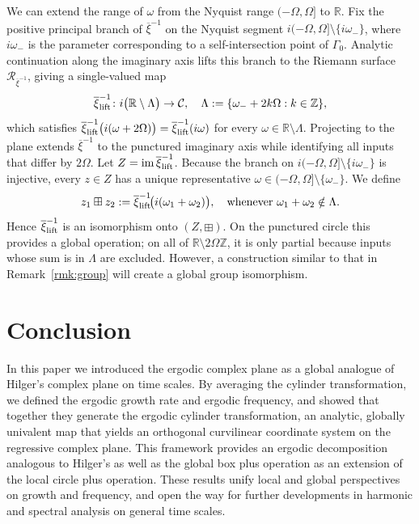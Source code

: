 \documentclass[reqno]{amsart}
\begin{document}
\begin{remark} \rm
We can extend the range of $\omega$ from the Nyquist range $(-\Omega,\Omega]$ to $\mathbb{R}$.
Fix the positive principal branch of $\overline{\xi}^{-1}$ on the Nyquist segment
$i(-\Omega,\Omega]\setminus\{i\omega_{-}\}$, where $i\omega_{-}$ is the
parameter corresponding to a self-intersection point of $\Gamma_0$.
Analytic continuation along the imaginary axis lifts this
branch to the Riemann surface $\mathcal R_{\overline{\xi}^{-1}}$, giving a
single-valued map
\[
 \overline{\xi}^{-1}_{\textup{lift}}\colon i\bigl(\mathbb{R}\setminus\Lambda\bigr)
 \to\mathcal{C},
 \quad
 \Lambda:=\{\omega_{-}+2k\Omega: k\in\mathbb{Z}\},
\]
which satisfies
$\overline{\xi}^{-1}_{\textup{lift}}\bigl(i(\omega+2\Omega)\bigr)=
 \overline{\xi}^{-1}_{\textup{lift}}(i\omega)$ for every
$\omega\in\mathbb{R}\setminus\Lambda$.
Projecting to the plane extends $\overline{\xi}^{-1}$ to the punctured imaginary
axis while identifying all inputs that differ by $2\Omega$.
Let $Z=\operatorname{im}\overline{\xi}^{-1}_{\textup{lift}}$.
Because the branch on
$i(-\Omega,\Omega]\setminus\{i\omega_{-}\}$ is injective, every
$z\in Z$ has a unique representative
$\omega\in(-\Omega,\Omega]\setminus\{\omega_{-}\}$.
We define
\[
 z_1\boxplus z_2:=
 \overline{\xi}^{-1}_{\textup{lift}}\!\bigl(i(\omega_1+\omega_2)\bigr),
 \quad
 \text{whenever }\omega_1+\omega_2\notin\Lambda.
\]
Hence $\overline{\xi}^{-1}_{\textup{lift}}$ is an isomorphism onto $(Z,\boxplus)$.
On the punctured circle this provides a global operation; on all of
$\mathbb{R}\setminus 2\Omega\mathbb{Z}$, it is only partial because inputs whose sum is in $\Lambda$
are excluded. However, a construction similar to that in Remark~\ref{rmk:group}
will create a global group isomorphism.
\end{remark}

\section{Conclusion}
In this paper we introduced the ergodic complex plane as a global analogue of Hilger's
complex plane on time scales. By averaging the cylinder transformation, we defined
the ergodic growth rate and ergodic frequency, and showed that together they generate
the ergodic cylinder transformation, an analytic, globally univalent map that yields
an orthogonal curvilinear coordinate system on the regressive complex plane.
This framework provides an ergodic decomposition analogous to Hilger's as well as the
global box plus operation as an extension of the local circle plus operation.
These results unify local and global perspectives on growth and frequency, and open
the way for further developments in harmonic and spectral analysis on general time
scales.
\end{document}
